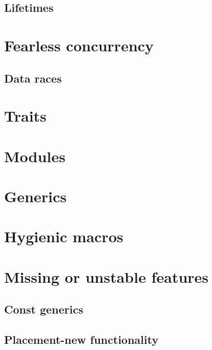 \subsection{Lifetimes}
\blindtext
\section{Fearless concurrency}
\blindtext
\subsection{Data races}
\blindtext
\section{Traits}
\blindtext
\section{Modules}
\blindtext
\section{Generics}
\blindtext
\section{Hygienic macros}
\blindtext
\section{Missing or unstable features}
\blindtext
\subsection{Const generics}
\blindtext
\subsection{Placement-new functionality}
\blindtext